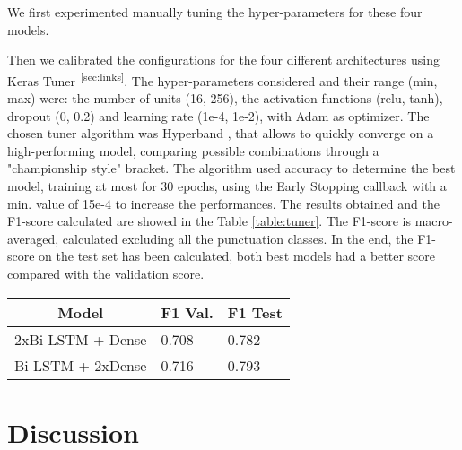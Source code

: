 \documentclass[11pt]{article}
\begin{document}

We first experimented manually tuning the hyper-parameters for these four models.

Then we calibrated the configurations for the four different architectures using 
Keras Tuner\textsuperscript{~\ref{sec:links}}. The hyper-parameters considered and their range (min, max) were: the number of units (16, 256), the activation functions (relu, tanh), dropout (0, 0.2) and learning rate (1e-4, 1e-2), with Adam as optimizer. 
The chosen tuner algorithm was Hyperband \cite{arxiv.1603.06560}, that allows to quickly converge on a high-performing model, comparing possible combinations through a "championship style" bracket. The algorithm used accuracy to determine the best model, training at most for 30 epochs, using the Early Stopping callback with a min. value of 15e-4 to increase the performances. 
The results obtained and the F1-score calculated are showed in the Table \ref{table:tuner}. The F1-score is macro-averaged, calculated excluding all the punctuation classes.  
In the end, the F1-score on the test set has been calculated, both best models had a better score compared with the validation score. 

\begin{table}[!h]
\begin{tabular}{l|l|l}
\multicolumn{1}{c|}{\textbf{Model}}       & \textbf{F1 Val.} & \multicolumn{1}{c}{\textbf{F1 Test}} \\ \hline
2xBi-LSTM + Dense	& 0.708		& 0.782	\\
Bi-LSTM + 2xDense	& 0.716		& 0.793
\end{tabular}
\end{table}

\section{Discussion}
\label{sec:discussion}
\end{document}
